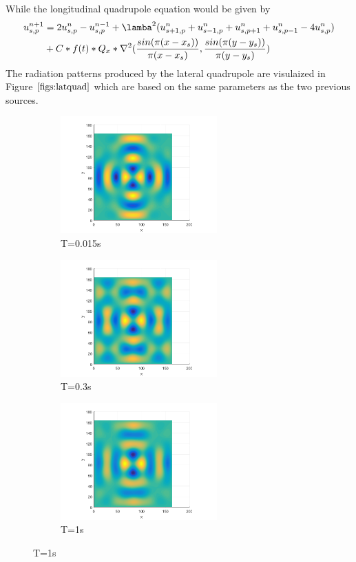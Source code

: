 While the longitudinal quadrupole equation would be given by
\begin{equation}
\label{eqn:FD5dquadlat}
	\begin{aligned}
	u^{n+1}_{s,p}&=2u^{n}_{s,p}-u^{n-1}_{s,p}+\lamba^{2}(u^{n}_{s+1,p}+u^{n}_{s-1,p}+u^{n}_{s,p+1}+u^{n}_{s,p-1}-4u^{n}_{s,p}) \\
			&+ C*f(t)*Q_{x}*\nabla^{2}(\frac{sin(\pi(x-x_{s}))}{\pi(x-x_{s})},\frac{sin(\pi(y-y_{s}))}{\pi(y-y_{s})})
	\end{aligned}
\end{equation}
The radiation patterns produced by the lateral quadrupole are visulaized in Figure $\ref{figs:latquad}$ which are based on the same parameters as the two previous sources.
\begin{figure}[h]
\begin{subfigure}{0.3 \textwidth}
	\centering
	\includegraphics[width=6cm]{./Chapter_4/_Figs/Quadrupole_lateral_001_5point_160Hz_L10m_8000Fs.png}
	\caption{T=0.015s}
\end{subfigure}
\begin{subfigure}{0.3 \textwidth}
	\centering
	\includegraphics[width=6cm]{./Chapter_4/_Figs/Quadrupole05_lateral_5point_160Hz_L10m_8000Fs.png}
	\caption{T=0.3s}
\end{subfigure}
\begin{subfigure}{0.3 \textwidth}
	\centering
	\includegraphics[width=6cm]{./Chapter_4/_Figs/Quadrupole1_lateral_5point_160Hz_L10m_8000Fs.png}
	\caption{T=1s}
\end{subfigure}
\label{figs:latquad}
\end{figure}


